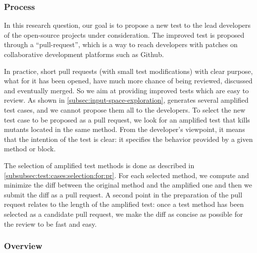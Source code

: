 \subsubsection{Process}

In this research question, our goal is to propose a new test to the lead developers of the open-source projects under consideration. 
The  improved test is proposed through a ``pull-request'', which is a way to reach developers with patches on collaborative development platforms such as Github.

In practice, short pull requests (\ie with small test modifications) with clear purpose, \ie what for it has been opened, have much more chance of being reviewed, discussed and eventually merged. So we aim at providing improved tests which are easy to review.
As shown in \autoref{subsec:input-space-exploration}, \dspot generates several amplified test cases, and we cannot propose them all to the developers.
To select the new test case to be  proposed as a pull request, we look for an amplified test that kills mutants located in the same method.
From the developer's viewpoint, it means that the intention of the test is clear: it specifies the behavior provided by a given method or block.

The selection of amplified test methods is done as described in \autoref{subsubsec:test:cases:selection:for:pr}. For each selected  method, we compute and minimize the diff between the original method and the amplified one and then we submit the diff as a pull request.
A second point in the preparation of the pull request relates to the length of the amplified test: once a test method has been selected as a candidate pull request, we make the diff as concise as possible for the review to be fast and easy.

\subsubsection{Overview}


